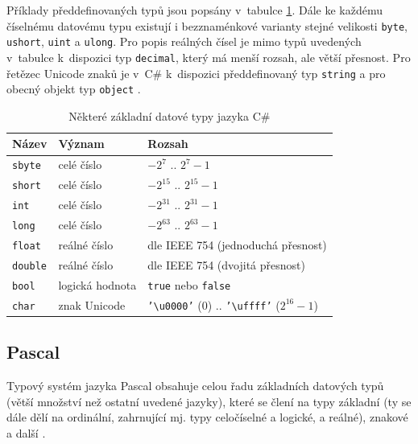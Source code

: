 \documentclass[czech,BP]{thesiskiv}
\begin{document}
Příklady předdefinovaných typů jsou popsány v~tabulce \ref{table:cs-types}. Dále ke každému číselnému datovému typu existují i bezznaménkové varianty stejné velikosti \texttt{byte}, \texttt{ushort}, \texttt{uint} a \texttt{ulong}. Pro popis reálných čísel je mimo typů uvedených v~tabulce k~dispozici typ \texttt{decimal}, který má menší rozsah, ale větší přesnost. Pro řetězec Unicode znaků je v~C\# k~dispozici předdefinovaný typ \texttt{string} a pro obecný objekt typ \texttt{object} \cite{cs-book, cs-guide-types, cs-guide-byte, cs-guide-ushort, cs-guide-uint, cs-guide-ulong, cs-guide-decimal, cs-guide-string, cs-guide-object}.

\begin{table}\centering
\caption{Některé základní datové typy jazyka C\#}
\begin{tabular}{| l | l | l |}
\hline
\textbf{Název} & \textbf{Význam} & \textbf{Rozsah} \\ \hline
\texttt{sbyte} & celé číslo & $-2^7$ .. $2^7-1$ \\ \hline
\texttt{short} & celé číslo & $-2^{15}$ .. $2^{15}-1$ \\ \hline
\texttt{int} & celé číslo & $-2^{31}$ .. $2^{31}-1$ \\ \hline
\texttt{long} & celé číslo & $-2^{63}$ .. $2^{63}-1$ \\ \hline
\texttt{float} & reálné číslo & dle IEEE 754 (jednoduchá přesnost) \\ \hline
\texttt{double} & reálné číslo & dle IEEE 754 (dvojitá přesnost) \\ \hline
\texttt{bool} & logická hodnota & \texttt{true} nebo \texttt{false} \\ \hline
\texttt{char} & znak Unicode & \texttt{'\textbackslash u0000'} ($0$) .. \texttt{'\textbackslash uffff'} ($2^{16} - 1$) \\ \hline
\end{tabular}
\label{table:cs-types}
\end{table}

\subsection{Pascal}
Typový systém jazyka Pascal obsahuje celou řadu základních datových typů (větší množství než ostatní uvedené jazyky), které se člení na typy základní (ty se dále dělí na ordinální, zahrnující mj. typy celočíselné a logické, a reálné), znakové a další \cite{pas-guide-types, pas-guide-base-types, pas-guide-character-types}.
\end{document}
